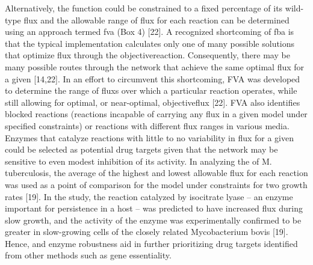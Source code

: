 Alternatively, the  function could be constrained to a fixed 
percentage of its wild-type \gls{flux} and the allowable range of \gls{flux} 
for each reaction can be determined using an approach termed 
\gls{fva} (Box 4) [22]. A recognized shortcoming 
of \gls{fba} is that the typical implementation calculates only one 
of many possible solutions that optimize \gls{flux} through the 
\gls{objectivereaction}. Consequently, there may be many possible routes through 
the network that achieve the same optimal \gls{flux} for a given 
 [14,22]. In an effort to circumvent this shortcoming, 
FVA was developed to determine the range of \glspl{flux} over which 
a particular reaction operates, while still allowing for 
optimal, or near-optimal, \gls{objectiveflux} [22]. FVA also identifies 
blocked reactions (reactions incapable of carrying any \gls{flux} in 
a given model under specified constraints) or reactions with 
different \gls{flux} ranges in various media. Enzymes that catalyze 
reactions with little to no variability in \gls{flux} for a given 
 could be selected as potential drug targets given that 
the network may be sensitive to even modest inhibition of its 
activity. In analyzing the  of M. tuberculosis, the 
average of the highest and lowest allowable \gls{flux} for each reaction 
was used as a point of comparison for the model under constraints 
for two growth rates [19]. In the study, the reaction catalyzed by 
isocitrate lyase – an enzyme important for persistence in a 
host – was predicted to have increased \gls{flux} during slow growth, 
and the activity of the enzyme was experimentally confirmed to 
be greater in slow-growing cells of the closely related 
Mycobacterium bovis [19]. Hence,  and enzyme 
robustness aid in further prioritizing drug targets identified 
from other methods such as gene essentiality.

